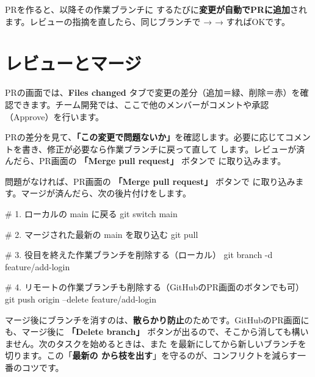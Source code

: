 
\begin{hintbox}
PRを作ると、以降その作業ブランチに  するたびに\textbf{変更が自動でPRに追加}されます。レビューの指摘を直したら、同じブランチで  →  →  すればOKです。
\end{hintbox}

\section{レビューとマージ}

PRの画面では、\textbf{Files changed} タブで変更の差分（追加＝緑、削除＝赤）を確認できます。チーム開発では、ここで他のメンバーがコメントや承認（Approve）を行います。

PRの差分を見て、\textbf{「この変更で問題ないか」}を確認します。必要に応じてコメントを書き、修正が必要なら作業ブランチに戻って直して  します。レビューが済んだら、PR画面の \textbf{「Merge pull request」} ボタンで  に取り込みます。


問題がなければ、PR画面の \textbf{「Merge pull request」} ボタンで  に取り込みます。マージが済んだら、次の後片付けをします。

\begin{codebox}[bash]
\begin{code}
# 1. ローカルの main に戻る
git switch main

# 2. マージされた最新の main を取り込む
git pull

# 3. 役目を終えた作業ブランチを削除する（ローカル）
git branch -d feature/add-login

# 4. リモートの作業ブランチも削除する（GitHubのPR画面のボタンでも可）
git push origin --delete feature/add-login
\end{code}
\end{codebox}

\begin{hintbox}
マージ後にブランチを消すのは、\textbf{散らかり防止}のためです。GitHubのPR画面にも、マージ後に \textbf{「Delete branch」} ボタンが出るので、そこから消しても構いません。次のタスクを始めるときは、また  を最新にしてから新しいブランチを切ります。この「\textbf{最新の  から枝を出す}」を守るのが、コンフリクトを減らす一番のコツです。
\end{hintbox}

